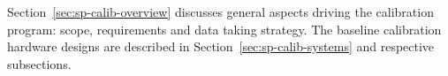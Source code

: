 



Section~\ref{sec:sp-calib-overview} discusses general aspects driving the calibration program: scope, requirements and data taking strategy.
The baseline calibration hardware designs are described in Section~\ref{sec:sp-calib-systems} and respective subsections. 


